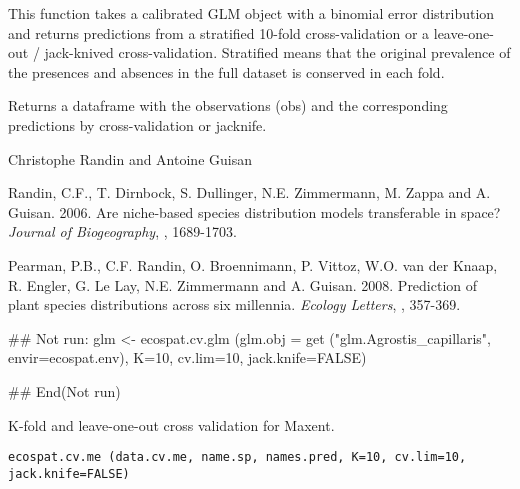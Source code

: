 \documentclass[a4paper]{book}
\begin{document}
%
\begin{Details}\relax
This function takes a calibrated GLM object with a binomial error distribution and returns predictions from a stratified 10-fold cross-validation or a leave-one-out / jack-knived cross-validation. Stratified means that the original prevalence of the presences and absences in the full dataset is conserved in each fold.
\end{Details}
%
\begin{Value}
Returns a dataframe with the observations (obs) and the corresponding predictions by cross-validation or jacknife.
\end{Value}
%
\begin{Author}\relax
Christophe Randin  and Antoine Guisan 
\end{Author}
%
\begin{References}\relax
Randin, C.F., T. Dirnbock, S. Dullinger, N.E. Zimmermann, M. Zappa and A. Guisan. 2006. Are niche-based species distribution models transferable in space? \emph{Journal of Biogeography}, , 1689-1703.

Pearman, P.B., C.F. Randin, O. Broennimann, P. Vittoz, W.O. van der Knaap, R. Engler, G. Le Lay, N.E. Zimmermann and A. Guisan. 2008. Prediction of plant species distributions across six millennia. \emph{Ecology Letters}, , 357-369.
\end{References}
%
\begin{Examples}
\begin{ExampleCode}
## Not run: 
glm <- ecospat.cv.glm (glm.obj = get ("glm.Agrostis_capillaris", envir=ecospat.env), 
K=10, cv.lim=10, jack.knife=FALSE)

## End(Not run)
\end{ExampleCode}
\end{Examples}
%
\begin{Description}\relax
K-fold and leave-one-out cross validation for Maxent.
\end{Description}
%
\begin{Usage}
\begin{verbatim}
ecospat.cv.me (data.cv.me, name.sp, names.pred, K=10, cv.lim=10, jack.knife=FALSE)
\end{verbatim}
\end{Usage}
%
\end{document}
